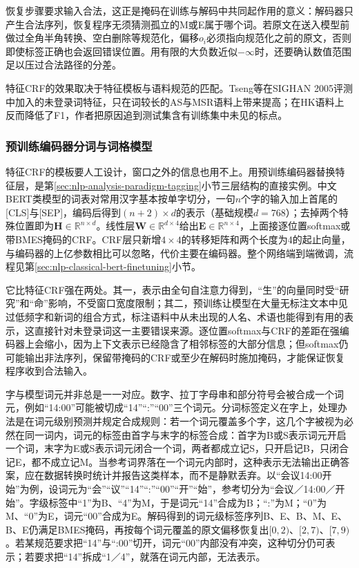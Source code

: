 恢复步骤要求输入合法，这正是掩码在训练与解码中共同起作用的意义：解码器只产生合法序列，恢复程序无须猜测孤立的M或E属于哪个词。若原文在送入模型前做过全角半角转换、空白删除等规范化，偏移$o_i$必须指向规范化之前的原文，否则即使标签正确也会返回错误位置。用有限的大负数近似$-\infty$时，还要确认数值范围足以压过合法路径的分差。

特征CRF的效果取决于特征模板与语料规范的匹配。Tseng等在SIGHAN 2005评测中加入的未登录词特征，只在词较长的AS与MSR语料上带来提高；在HK语料上反而降低了F1，作者把原因追到测试集含有训练集中未见的标点。

\subsubsection{预训练编码器分词与词格模型}
\label{sec:nlp-analysis-pretrained-lattice}

特征CRF的模板要人工设计，窗口之外的信息也用不上。用预训练编码器替换特征层，是第\ref{sec:nlp-analysis-paradigm-tagging}小节三层结构的直接实例。中文BERT类模型的词表对常用汉字基本按单字切分，一句$n$个字的输入加上首尾的[CLS]与[SEP]，编码后得到$(n+2)\times d$的表示（基础规模$d=768$）；去掉两个特殊位置即为$\bm H\in\mathbb R^{n\times d}$。线性层$\bm W\in\mathbb R^{d\times4}$给出$\bm E\in\mathbb R^{n\times4}$，上面接逐位置softmax或带BMES掩码的CRF。CRF层只新增$4\times4$的转移矩阵和两个长度为4的起止向量，与编码器的上亿参数相比可以忽略，代价主要在编码器。整个网络端到端微调，流程见第\ref{sec:nlp-classical-bert-finetuning}小节。

它比特征CRF强在两处。其一，表示由全句自注意力得到，“生”的向量同时受“研究”和“命”影响，不受窗口宽度限制；其二，预训练让模型在大量无标注文本中见过低频字和新词的组合方式，标注语料中从未出现的人名、术语也能得到有用的表示，这直接针对未登录词这一主要错误来源。逐位置softmax与CRF的差距在强编码器上会缩小，因为上下文表示已经隐含了相邻标签的大部分信息；但softmax仍可能输出非法序列，保留带掩码的CRF或至少在解码时施加掩码，才能保证恢复程序收到合法输入。

字与模型词元并非总是一一对应。数字、拉丁字母串和部分符号会被合成一个词元，例如“14:00”可能被切成“14”“:”“00”三个词元。分词标签定义在字上，处理办法是在词元级别预测并规定合成规则：若一个词元覆盖多个字，这几个字被视为必然在同一词内，词元的标签由首字与末字的标签合成：首字为B或S表示词元开启一个词，末字为E或S表示词元闭合一个词，两者都成立记S，只开启记B，只闭合记E，都不成立记M。当参考词界落在一个词元内部时，这种表示无法输出正确答案，应在数据转换时统计并报告这类样本，而不是静默丢弃。以“会议14:00开始”为例，设词元为“会”“议”“14”“:”“00”“开”“始”，参考切分为“会议／14:00／开始”。字级标签中“1”为B、“4”为M，于是词元“14”合成为B；“:”为M；“0”为M、“0”为E，词元“00”合成为E。解码得到的词元级标签序列B、E、B、M、E、B、E仍满足BMES掩码，再按每个词元覆盖的原文偏移恢复出$[0,2)$、$[2,7)$、$[7,9)$。若某规范要求把“14”与“:00”切开，词元“00”内部没有冲突，这种切分仍可表示；若要求把“14”拆成“1／4”，就落在词元内部，无法表示。


